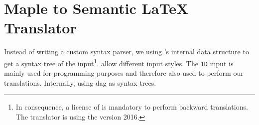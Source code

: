 \section{Maple to Semantic \LaTeX{} Translator}\label{sec:backward-translation}
Instead of writing a custom \Maple{} syntax parser, we using \Maple's internal data structure to get a syntax tree of the input\footnote{In consequence, a license of \Maple{} is mandatory to perform backward translations. The translator is using the version \Maple{} 2016.}. \Maple{} allow different input styles. The \texttt{1D} input is mainly used for programming purposes and therefore also used to perform our translations. Internally, \Maple{} using \gls*{dag} as syntax trees.




